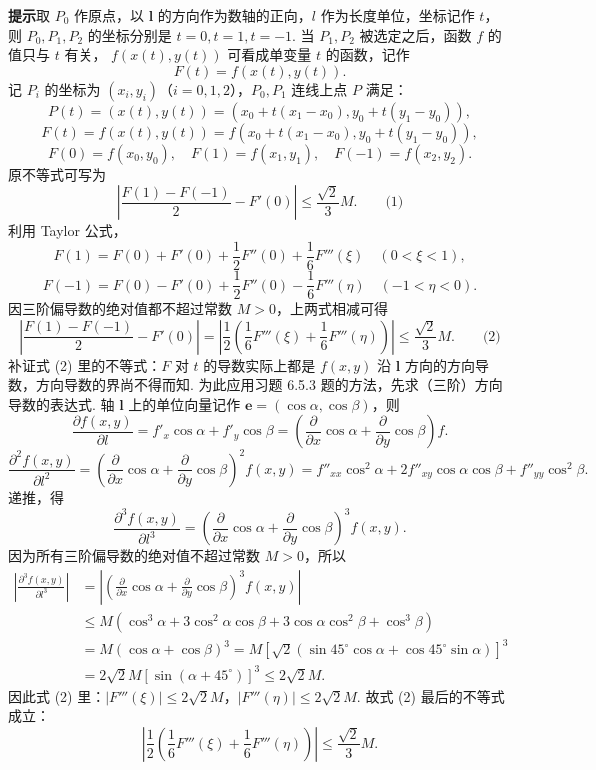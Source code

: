 \documentclass[UTF8, 12pt, fontset=fandol, oneside]{ctexart}
\begin{document}
\noindent\textbf{提示}\quad 取 $P_0$ 作原点，以 $\mathbf l$ 的方向作为数轴的正向，$l$ 作为长度单位，坐标记作 $t$，则 $P_0,P_1,P_2$ 的坐标分别是
$t=0,t=1,t=-1$. 当 $P_1,P_2$ 被选定之后，函数 $f$ 的值只与 $t$ 有关，
$f(x(t),y(t))$ 可看成单变量 $t$ 的函数，记作
\[
  F(t)=f(x(t),y(t)).
\]
记 $P_i$ 的坐标为 $(x_i,y_i)$（$i=0,1,2$），$P_0,P_1$ 连线上点 $P$ 满足：
\[
  P(t)=(x(t),y(t))=(x_0+t(x_1-x_0),y_0+t(y_1-y_0)),
\]
\[
  F(t)=f(x(t),y(t))
  =
  f(x_0+t(x_1-x_0),y_0+t(y_1-y_0)),
\]
\[
  F(0)=f(x_0,y_0),\quad F(1)=f(x_1,y_1),\quad F(-1)=f(x_2,y_2).
\]
原不等式可写为
\[
  \left|\frac{F(1)-F(-1)}2-F'(0)\right|
  \le\frac{\sqrt2}{3}M. \qquad\text{(1)}
\]
利用 Taylor 公式，
\[
  F(1)=F(0)+F'(0)+\frac12F''(0)+\frac16F'''(\xi)\quad(0<\xi<1),
\]
\[
  F(-1)=F(0)-F'(0)+\frac12F''(0)-\frac16F'''(\eta)\quad(-1<\eta<0).
\]
因三阶偏导数的绝对值都不超过常数 $M>0$，上两式相减可得
\[
\left|
\frac{F(1)-F(-1)}2-F'(0)
\right|
=
\left|
\frac12\left(\frac16F'''(\xi)+\frac16F'''(\eta)\right)
\right|
\le\frac{\sqrt2}{3}M. \qquad\text{(2)}
\]
补证式 (2) 里的不等式：$F$ 对 $t$ 的导数实际上都是 $f(x,y)$ 沿 $\mathbf l$ 方向的方向导数，方向导数的界尚不得而知. 为此应用习题 6.5.3 题的方法，先求（三阶）方向导数的表达式. 轴 $\mathbf l$ 上的单位向量记作
$\mathbf e=(\cos\alpha,\cos\beta)$，则
\[
\frac{\partial f(x,y)}{\partial l}
=f'_x\cos\alpha+f'_y\cos\beta
=\left(\frac{\partial}{\partial x}\cos\alpha+\frac{\partial}{\partial y}\cos\beta\right)f.
\]
\[
\frac{\partial^2f(x,y)}{\partial l^2}
=
\left(\frac{\partial}{\partial x}\cos\alpha+\frac{\partial}{\partial y}\cos\beta\right)^2f(x,y)
=f''_{xx}\cos^2\alpha+2f''_{xy}\cos\alpha\cos\beta+f''_{yy}\cos^2\beta.
\]
递推，得
\[
  \frac{\partial^3f(x,y)}{\partial l^3}
  =
  \left(\frac{\partial}{\partial x}\cos\alpha+\frac{\partial}{\partial y}\cos\beta\right)^3f(x,y).
\]
因为所有三阶偏导数的绝对值不超过常数 $M>0$，所以
\[
\begin{aligned}
\left|\frac{\partial^3f(x,y)}{\partial l^3}\right|
&=
\left|
\left(\frac{\partial}{\partial x}\cos\alpha+\frac{\partial}{\partial y}\cos\beta\right)^3f(x,y)
\right|\\
&\le M(\cos^3\alpha+3\cos^2\alpha\cos\beta
  +3\cos\alpha\cos^2\beta+\cos^3\beta)\\
&=M(\cos\alpha+\cos\beta)^3
=M[\sqrt2(\sin45^\circ\cos\alpha+\cos45^\circ\sin\alpha)]^3\\
&=2\sqrt2M[\sin(\alpha+45^\circ)]^3\le2\sqrt2M.
\end{aligned}
\]
因此式 (2) 里：$|F'''(\xi)|\le2\sqrt2M$，$|F'''(\eta)|\le2\sqrt2M$. 故式 (2) 最后的不等式成立：
\[
  \left|\frac12\left(\frac16F'''(\xi)+\frac16F'''(\eta)\right)\right|
  \le\frac{\sqrt2}{3}M.
\]
\end{document}
